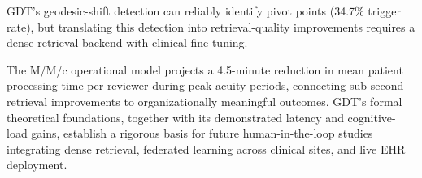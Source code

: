 \documentclass[11pt]{article}
\begin{document}
GDT's geodesic-shift detection can reliably identify pivot points (34.7\% trigger rate), but translating this detection into retrieval-quality improvements requires a dense retrieval backend with clinical fine-tuning.

The M/M/c operational model projects a 4.5-minute reduction in mean patient processing time per reviewer during peak-acuity periods, connecting sub-second retrieval improvements to organizationally meaningful outcomes. GDT's formal theoretical foundations, together with its demonstrated latency and cognitive-load gains, establish a rigorous basis for future human-in-the-loop studies integrating dense retrieval, federated learning across clinical sites, and live EHR deployment.



\end{document}
